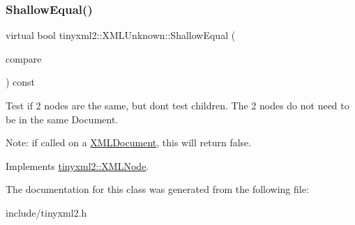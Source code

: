 \subsubsection{\texorpdfstring{ShallowEqual()}{ShallowEqual()}}
{\footnotesize\ttfamily virtual bool tinyxml2\+::\+X\+M\+L\+Unknown\+::\+Shallow\+Equal (\begin{DoxyParamCaption}\item[{const \mbox{\hyperlink{classtinyxml2_1_1XMLNode}{X\+M\+L\+Node}} $\ast$}]{compare }\end{DoxyParamCaption}) const\hspace{0.3cm}{\ttfamily [virtual]}}

Test if 2 nodes are the same, but don\textquotesingle{}t test children. The 2 nodes do not need to be in the same Document.

Note\+: if called on a \mbox{\hyperlink{classtinyxml2_1_1XMLDocument}{X\+M\+L\+Document}}, this will return false. 

Implements \mbox{\hyperlink{classtinyxml2_1_1XMLNode_a7ce18b751c3ea09eac292dca264f9226}{tinyxml2\+::\+X\+M\+L\+Node}}.



The documentation for this class was generated from the following file\+:\begin{DoxyCompactItemize}
\item 
include/tinyxml2.\+h\end{DoxyCompactItemize}

